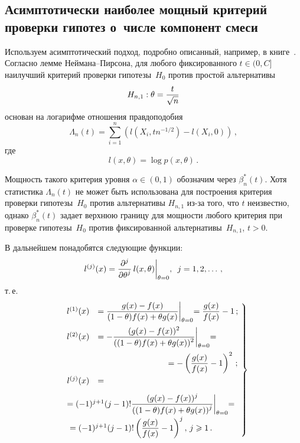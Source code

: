 \begin{multicols}{2}
{}

\section{Асимптотически
наиболее мощный критерий проверки гипотез о~числе компонент смеси}

Используем асимптотический подход, подробно описанный, например, в
книге~\cite{Bening2000}. Согласно лемме Ней\-ма\-на--Пир\-со\-на, для любого
фиксированного $t\in(0,C]$ наилучший критерий проверки гипотезы~$H_0$ 
против простой альтернативы
\begin{equation*}
H_{n,1}:\theta=\displaystyle\frac{\displaystyle t\mathstrut}{\displaystyle \sqrt{n}\mathstrut} 
\end{equation*}
основан на логарифме отношения правдоподобия
\begin{equation}
\label{Lambda}
\Lambda_n(t)=\sum\limits_{i=1}^{n}\left(l(X_i,tn^{-1/2})-l(X_i,0)\right)\,,
\end{equation}
где
$$
l(x,\theta)=\log p(x,\theta)\,.
$$

Мощность такого критерия уровня $\alpha\in(0,1)$ обозначим через
$\beta^*_n(t)$. Хотя статистика $\Lambda_n(t)$ не может быть
использована для построения критерия проверки гипотезы~$H_0$ против
альтернативы $H_{n,1}$ из-за того, что $t$ неизвестно, однако
$\beta^*_n(t)$ задает верхнюю границу для мощности любого критерия
при проверке гипотезы~$H_0$ против фиксированной альтернативы~$H_{n,1}$, $t>0$.

В дальнейшем понадобятся следующие функции:
$$
l^{(j)}(x)=\displaystyle\frac{\displaystyle \partial^{j}\mathstrut}{\displaystyle \partial\theta^{j}\mathstrut}\,l(x,\theta)\biggl|_{\theta=0},
\enskip j=1,2,\ldots\,,
$$
т.\,е.\
\begin{equation}
\left.
\begin{array}{rl}
\!\!\!l^{(1)}(x)&=\fr{g(x)-f(x)}{(1-\theta)f(x)+\theta g(x)}\biggl|_{\theta=0}=
\fr{g(x)}{f(x)}-1\,;\\[12pt]
\!\!\!l^{(2)}(x)&=-\fr{(g(x)-f(x))^2}{((1-\theta)f(x)+\theta
g(x))^2}\biggl|_{\theta=0}={}\\[12pt]
&\hspace*{30mm}=-\left(\fr{g(x)}{f(x)}-1\right)^2\,;\\[9pt]
l^{(j)}(x)&={}\\[9pt]
&\!\!\!\!\!\!\!\!\!\!\!\!\!\!\!\!\!\!\!\!\!\!\!\!{}=(-1)^{j+1}(j-1)!\fr{(g(x)-f(x))^j}{((1-\theta)f(x)+\theta
g(x))^j}\biggl|_{\theta=0}={}\\[9pt]
&\!\!\!\!\!\!\!\!\!\!\!\!\!\!\!\!\!\!\!\!\!\!{}=(-1)^{j+1}(j-1)!\left(\fr{g(x)}{f(x)}-1\right)^j,\,j\geqslant1\,.
\end{array}\!
\right\}\!\!
\label{lj(x)}
\end{equation}


\end{multicols}

